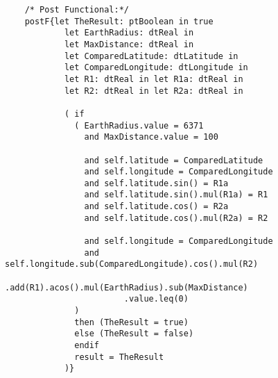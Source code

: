 	\scriptsize
	\vspace{0.5cm}
	\begin{lstlisting}[style=MessirStyle,firstnumber=auto,captionpos=b,caption={\msrmessir (MCL-oriented) specification of the operation \emph{isNearTo}.},label=OM-dtGPSLocation-isNearTo-MCL-LST]

	
	
	/* Post Functional:*/ 
	postF{let TheResult: ptBoolean in true
	        let EarthRadius: dtReal in
	        let MaxDistance: dtReal in
	        let ComparedLatitude: dtLatitude in
	        let ComparedLongitude: dtLongitude in
	        let R1: dtReal in let R1a: dtReal in
	        let R2: dtReal in let R2a: dtReal in
	        
	        ( if
	          ( EarthRadius.value = 6371
	            and MaxDistance.value = 100
	            
	            and self.latitude = ComparedLatitude
	            and self.longitude = ComparedLongitude
	            and self.latitude.sin() = R1a
	            and self.latitude.sin().mul(R1a) = R1
	            and self.latitude.cos() = R2a
	            and self.latitude.cos().mul(R2a) = R2
	            
	            and self.longitude = ComparedLongitude
	            and self.longitude.sub(ComparedLongitude).cos().mul(R2)
	                    .add(R1).acos().mul(EarthRadius).sub(MaxDistance)
	                    .value.leq(0)
	          )
	          then (TheResult = true)
	          else (TheResult = false)
	          endif
	          result = TheResult
	        )}
	
	
	\end{lstlisting}
	\normalsize 
	
	
	
	





